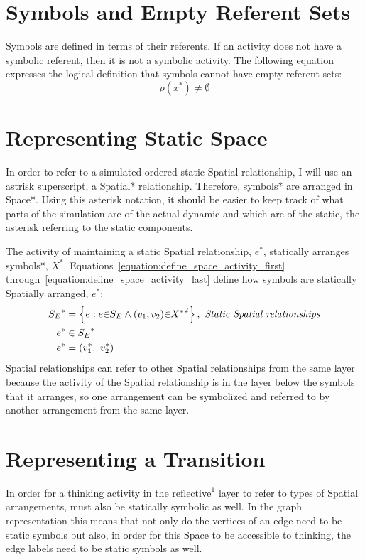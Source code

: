 \section{Symbols and Empty Referent Sets}

Symbols are defined in terms of their referents.  If an activity does
not have a symbolic referent, then it is not a symbolic activity.  The
following equation expresses the logical definition that symbols
cannot have empty referent sets:
\begin{equation*}
\rho(x^*) \neq \emptyset
\end{equation*}

\section{Representing Static Space}

In order to refer to a simulated ordered static Spatial relationship,
I will use an astrisk superscript, a Spatial* relationship.
Therefore, symbols* are arranged in Space*.  Using this asterisk
notation, it should be easier to keep track of what parts of the
simulation are of the actual dynamic and which are of the static, the
asterisk referring to the static components.

The activity of maintaining a static Spatial relationship, $e^*$,
statically arranges symbols*, $X^*$.
Equations~\ref{equation:define_space_activity_first}
through~\ref{equation:define_space_activity_last} define how symbols
are statically Spatially arranged, $e^*$:
\begin{align}
\label{equation:define_space_activity_first}
        {S_E}^* &= \left\{e : e{\in}S_E \wedge (v_1, v_2) {\in} {X^*}^2\right\}, ~\text{\emph{Static Spatial relationships}} \\
      e^* &\in {S_E}^* \\
\label{equation:define_space_activity_last}
      e^* &= (v_1^*, ~v_2^*)
\end{align}
Spatial relationships can refer to other Spatial relationships from
the same layer because the activity of the Spatial relationship is in
the layer below the symbols that it arranges, so one arrangement can
be symbolized and referred to by another arrangement from the same
layer.

\section{Representing a Transition}

In order for a thinking activity in the $\text{reflective}^1$ layer to
refer to types of Spatial arrangements, must also be statically
symbolic as well.  In the graph representation this means that not
only do the vertices of an edge need to be static symbols but also, in
order for this Space to be accessible to thinking, the edge labels
need to be static symbols as well.

